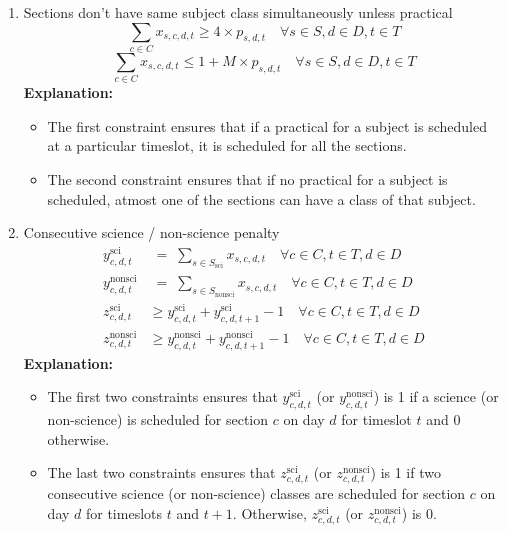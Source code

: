 \documentclass[11pt]{article}
\begin{document}
\begin{enumerate}
    \item Sections don't have same subject class simultaneously unless practical
    \[
        \sum_{c \in C} x_{s,c,d,t} \geq 4 \times p_{s,d,t} \quad \forall s \in S, d \in D, t \in T
    \]
    \[
        \sum_{c \in C} x_{s,c,d,t} \leq 1 + M \times p_{s,d,t} \quad \forall s \in S, d \in D, t \in T
    \]
    \textbf{Explanation:}
    \begin{itemize}
        \item The first constraint ensures that if a practical for a subject is scheduled at a particular timeslot, it is scheduled for all the sections.
        \item The second constraint ensures that if no practical for a subject is scheduled, atmost one of the sections can have a class of that subject.
    \end{itemize}

    \item Consecutive science / non-science penalty
    \begin{align*}
        y^{\mathrm{sci}}_{c,d,t} &\;=\; \sum_{s\in S_{\mathrm{sci}}} x_{s,c,d,t} \quad \forall c \in C, t \in T, d \in D\\
        y^{\mathrm{nonsci}}_{c,d,t} &\;=\; \sum_{s\in S_{\mathrm{nonsci}}} x_{s,c,d,t} \quad \forall c \in C, t \in T, d \in D\\
        z^{\mathrm{sci}}_{c,d,t} &\ge y^{\mathrm{sci}}_{c,d,t}+y^{\mathrm{sci}}_{c,d,t+1}-1 \quad \forall c \in C, t \in T, d \in D\\
        z^{\mathrm{nonsci}}_{c,d,t} &\ge y^{\mathrm{nonsci}}_{c,d,t}+y^{\mathrm{nonsci}}_{c,d,t+1}-1 \quad \forall c \in C, t \in T, d \in D
      \end{align*}
      \textbf{Explanation:}
      \begin{itemize}
        \item The first two constraints ensures that \(y^{\mathrm{sci}}_{c,d,t}\) (or \(y^{\mathrm{nonsci}}_{c,d,t}\)) is 1 if a science (or non-science) is scheduled for section \(c\) on day \(d\) for timeslot \(t\) and 0 otherwise.
        \item The last two constraints ensures that \(z^{\mathrm{sci}}_{c,d,t}\) (or \(z^{\mathrm{nonsci}}_{c,d,t}\)) is 1 if two consecutive science (or non-science) classes are scheduled for section \(c\) on day \(d\) for timeslots \(t\) and \(t+1\). Otherwise,  \(z^{\mathrm{sci}}_{c,d,t}\) (or \(z^{\mathrm{nonsci}}_{c,d,t}\)) is 0.
      \end{itemize}


\end{enumerate}
\end{document}
